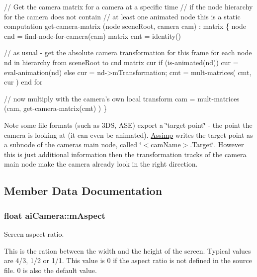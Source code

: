 \begin{DoxyCode}
\textcolor{comment}{// Get the camera matrix for a camera at a specific time}
\textcolor{comment}{// if the node hierarchy for the camera does not contain}
\textcolor{comment}{// at least one animated node this is a static computation}
\textcolor{keyword}{get}-camera-matrix (node sceneRoot, camera cam) : matrix
\{
   node   cnd = find-node-\textcolor{keywordflow}{for}-camera(cam)
   matrix cmt = identity()

   \textcolor{comment}{// as usual - get the absolute camera transformation for this frame}
   for each node nd in hierarchy from sceneRoot to cnd
     matrix cur
     if (is-animated(nd))
        cur = eval-animation(nd)
     else cur = nd->mTransformation;
     cmt = mult-matrices( cmt, cur )
   end for

   \textcolor{comment}{// now multiply with the camera's own local transform}
   cam = mult-matrices (cam, get-camera-matrix(cmt) )
\}
\end{DoxyCode}


\begin{DoxyNote}{Note}
some file formats (such as 3\+DS, A\+SE) export a \char`\"{}target point\char`\"{} -\/ the point the camera is looking at (it can even be animated). \hyperlink{namespace_assimp}{Assimp} writes the target point as a subnode of the camera\textquotesingle{}s main node, called \char`\"{}$<$cam\+Name$>$.\+Target\char`\"{}. However this is just additional information then the transformation tracks of the camera main node make the camera already look in the right direction. 
\end{DoxyNote}


\subsection{Member Data Documentation}
\subsubsection[{\texorpdfstring{m\+Aspect}{mAspect}}]{\setlength{\rightskip}{0pt plus 5cm}float ai\+Camera\+::m\+Aspect}\hypertarget{structai_camera_ae414556eaa6f910b5927f465d97bf70c}{}\label{structai_camera_ae414556eaa6f910b5927f465d97bf70c}
Screen aspect ratio.

This is the ration between the width and the height of the screen. Typical values are 4/3, 1/2 or 1/1. This value is 0 if the aspect ratio is not defined in the source file. 0 is also the default value. 
